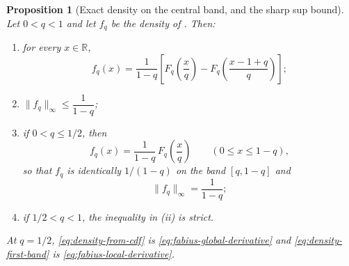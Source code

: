 \documentclass[11pt,oneside,openany]{book}
\newtheorem{proposition}[proposition]{Proposition}
\theoremstyle{definition}
\theoremstyle{remark}
\newcommand{\R}{\mathbb R}
\newcommand{\norm}[1]{\lVert #1\rVert}
\begin{document}
\begin{proposition}[Exact density on the central band, and the sharp sup bound]\label{prop:geometric-uniform-density-band}
Let $0<q<1$ and let $f_q$ be the density of
.  Then:
\begin{enumerate}
\item for every $x\in\R$,
\begin{equation}\label{eq:density-from-cdf}
 f_q(x)=\frac1{1-q}
 \left[F_q\!\left(\frac xq\right)-F_q\!\left(\frac{x-1+q}{q}\right)\right];
\end{equation}
\item $\norm{f_q}_\infty\le\dfrac1{1-q}$;
\item if $0<q\le1/2$, then
\begin{equation}\label{eq:density-first-band}
 f_q(x)=\frac1{1-q}\,F_q\!\left(\frac xq\right)
 \qquad(0\le x\le1-q),
\end{equation}
so that $f_q$ is identically $1/(1-q)$ on the band $[q,1-q]$ and
\begin{equation}\label{eq:density-sup-exact}
 \norm{f_q}_\infty=\frac1{1-q};
\end{equation}
\item if $1/2<q<1$, the inequality in (ii) is strict.
\end{enumerate}
At $q=1/2$, \eqref{eq:density-from-cdf} is \eqref{eq:fabius-global-derivative} and
\eqref{eq:density-first-band} is \eqref{eq:fabius-local-derivative}.
\end{proposition}
\end{document}
